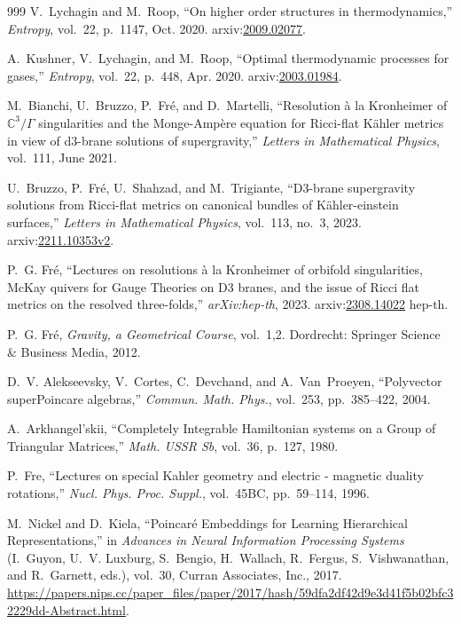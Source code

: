 \documentclass[10pt,a4paper]{article}
\begin{document}
\begin{thebibliography}{999}
V.~Lychagin and M.~Roop, ``On higher order structures in thermodynamics,'' {\em
  Entropy}, vol.~22, p.~1147, Oct. 2020.
\newblock arxiv:\href{https://arxiv.org/abs/2009.02077}{2009.02077}.

A.~Kushner, V.~Lychagin, and M.~Roop, ``Optimal thermodynamic processes for
  gases,'' {\em Entropy}, vol.~22, p.~448, Apr. 2020.
\newblock arxiv:\href{https://arxiv.org/abs/2003.01984}{2003.01984}.

M.~Bianchi, U.~Bruzzo, P.~Fr{\'{e}}, and D.~Martelli, ``Resolution {\`{a}} la
  {K}ronheimer of $\mathbb{C}^3/{\Gamma}$ singularities and the
  {M}onge-{A}mp{\`{e}}re equation for {R}icci-flat {K}\"{a}hler metrics in view
  of d3-brane solutions of supergravity,'' {\em Letters in Mathematical
  Physics}, vol.~111, June 2021.

U.~Bruzzo, P.~Fr\'{e}, U.~Shahzad, and M.~Trigiante, ``D3-brane supergravity
  solutions from {R}icci-flat metrics on canonical bundles of
  {K}\"ahler-einstein surfaces,'' {\em Letters in Mathematical Physics},
  vol.~113, no.~3, 2023.
\newblock arxiv:\href{https://arxiv.org/abs/2211.10353v2}{2211.10353v2}.

P.~G. Fr{\'e}, ``{L}ectures on resolutions \`a la {K}ronheimer of orbifold
  singularities, {M}c{K}ay quivers for {G}auge {T}heories on {D}3 branes, and
  the issue of {R}icci flat metrics on the resolved three-folds,'' {\em
  arXiv:hep-th}, 2023.
\newblock arxiv:\href{https://arxiv.org/abs/2308.14022}{2308.14022} hep-th.

P.~G. Fr{\'e}, {\em Gravity, a Geometrical Course}, vol.~1,2.
\newblock Dordrecht: Springer Science \& Business Media, 2012.

D.~V. Alekseevsky, V.~Cortes, C.~Devchand, and A.~Van~Proeyen, ``{Polyvector
  superPoincare algebras},'' {\em Commun. Math. Phys.}, vol.~253, pp.~385--422,
  2004.

A.~{A}rkhangel'skii, ``{C}ompletely {I}ntegrable {H}amiltonian systems on a
  {G}roup of {T}riangular {M}atrices,'' {\em Math. USSR Sb}, vol.~36, p.~127,
  1980.

P.~Fre, ``{Lectures on special Kahler geometry and electric - magnetic duality
  rotations},'' {\em Nucl. Phys. Proc. Suppl.}, vol.~45BC, pp.~59--114, 1996.

M.~{N}ickel and D.~{K}iela, ``{P}oincar\'e {E}mbeddings for {L}earning
  {H}ierarchical {R}epresentations,'' in {\em Advances in {Neural}
  {Information} {Processing} {Systems}} (I.~Guyon, U.~V. Luxburg, S.~Bengio,
  H.~Wallach, R.~Fergus, S.~Vishwanathan, and R.~Garnett, eds.), vol.~30,
  Curran Associates, Inc., 2017.
\newblock
  \url{https://papers.nips.cc/paper_files/paper/2017/hash/59dfa2df42d9e3d41f5b02bfc32229dd-Abstract.html}.


\end{thebibliography}
\end{document}
